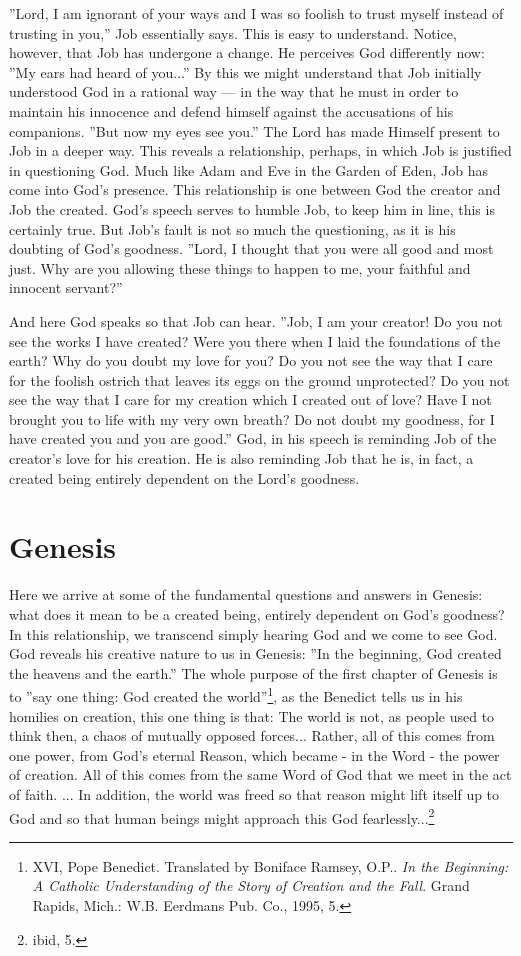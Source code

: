 ''Lord, I am ignorant of your ways and I was so foolish to trust myself instead of trusting in you,'' Job essentially says. This is easy to understand. Notice, however, that Job has undergone a change. He perceives God differently now: ''My ears had heard of you...'' By this we might understand that Job initially understood God in a rational way --- in the way that he must in order to maintain his innocence and defend himself against the accusations of his companions. ''But now my eyes see you.'' The Lord has made Himself present to Job in a deeper way. This reveals a relationship, perhaps, in which Job is justified in questioning God. Much like Adam and Eve in the Garden of Eden, Job has come into God's presence. This relationship is one between God the creator and Job the created. God's speech serves to humble Job, to keep him in line, this is certainly true. But Job's fault is not so much the questioning, as it is his doubting of God's goodness. ''Lord, I thought that you were all good and most just. Why are you allowing these things to happen to me, your faithful and innocent servant?''

And here God speaks so that Job can hear. ''Job, I am your creator! Do you not see the works I have created? Were you there when I laid the foundations of the earth? Why do you doubt my love for you? Do you not see the way that I care for the foolish ostrich that leaves its eggs on the ground unprotected? Do you not see the way that I care for my creation which I created out of love? Have I not brought you to life with my very own breath? Do not doubt my goodness, for I have created you and you are good.'' God, in his speech is reminding Job of the creator's love for his creation. He is also reminding Job that he is, in fact, a created being entirely dependent on the Lord's goodness.

	\section{Genesis}
Here we arrive at some of the fundamental questions and answers in Genesis: what does it mean to be a created being, entirely dependent on God's goodness? In this relationship, we transcend simply hearing God and we come to see God. God reveals his creative nature to us in Genesis: ''In the beginning, God created the heavens and the earth.'' The whole purpose of the first chapter of Genesis is to ''say one thing: God created the world''\footnote{XVI, Pope Benedict. Translated by Boniface Ramsey, O.P.. \emph{In the Beginning: A Catholic Understanding of the Story of Creation and the Fall}. Grand Rapids, Mich.: W.B. Eerdmans Pub. Co., 1995, 5.}, as the Benedict tells us in his homilies on creation, this one thing is that: 
The world is not, as people used to think then, a chaos of mutually opposed forces... Rather, all of this comes from one power, from God's eternal Reason, which became - in the Word - the power of creation. All of this comes from the same Word of God that we meet in the act of faith. ... In addition, the world was freed so that reason might lift itself up to God and so that human beings might approach this God fearlessly...\footnote{ibid, 5.}


